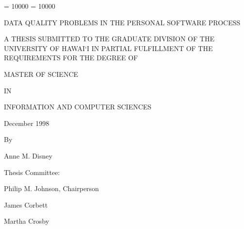 
\clubpenalty = 10000    
\widowpenalty = 10000
\sloppy
\thispagestyle{empty}

\par\vspace*{0.00in}

\begin{center}
  DATA QUALITY PROBLEMS IN THE PERSONAL SOFTWARE PROCESS
\end{center}

\vspace*{0.6in}

  \begin{center}  
  A THESIS SUBMITTED TO THE GRADUATE DIVISION OF THE\\
  
  UNIVERSITY OF HAWAI`I IN PARTIAL FULFILLMENT OF THE\\
  
  REQUIREMENTS FOR THE DEGREE OF 
\end{center}

\begin{center}

  MASTER OF SCIENCE

 IN

 INFORMATION AND COMPUTER SCIENCES

 December 1998


\vspace*{0.7in}
 
  By   
  
  \vspace{.2in}
  
  Anne M. Disney

  \vspace{0.2in}
\end{center}  

\begin{center}
  Thesis Committee:
  \vspace{0.2in}

  Philip M. Johnson, Chairperson

  James Corbett

  Martha Crosby

\end{center}  



